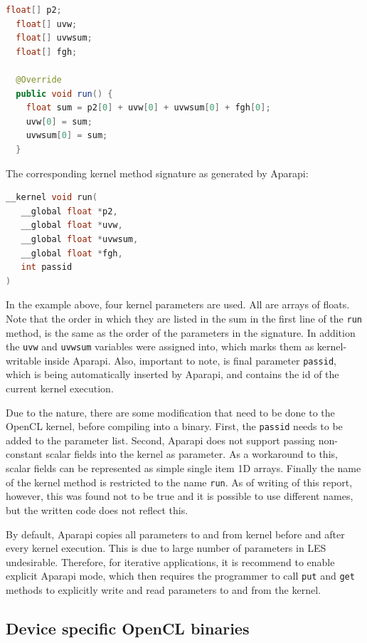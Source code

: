 \documentclass{l4proj}
\begin{document}
\begin{lstlisting}[language=Java]
  float[] p2;
  float[] uvw;
  float[] uvwsum;
  float[] fgh;

  @Override
  public void run() {
    float sum = p2[0] + uvw[0] + uvwsum[0] + fgh[0];
    uvw[0] = sum;
    uvwsum[0] = sum;
  }
\end{lstlisting}
The corresponding kernel method signature as generated by Aparapi:
\begin{lstlisting}[language=C]
__kernel void run(
   __global float *p2, 
   __global float *uvw, 
   __global float *uvwsum, 
   __global float *fgh,
   int passid
)
\end{lstlisting}
In the example above, four kernel parameters are used. All are arrays of floats.
Note that the order in which they are listed in the sum in the first line of the 
\texttt{run} method, is the same as the order of the parameters in the signature.
In addition the \texttt{uvw} and \texttt{uvwsum} variables were assigned into,
which marks them as kernel-writable inside Aparapi. Also, important to note,
is final parameter \texttt{passid}, which is being automatically inserted by Aparapi,
and contains the id of the current kernel execution.

Due to the nature, there are some modification that need to be done to the OpenCL
kernel, before compiling into a binary. First, the \texttt{passid} needs to be added to
the parameter list. Second, Aparapi does not support passing non-constant scalar fields
into the kernel as parameter. As a workaround to this, scalar fields can be represented
as simple single item 1D arrays. Finally the name of the kernel method is restricted to
the name \texttt{run}. As of writing of this report, however, this was found not to be true
and it is possible to use different names, but the written code does not reflect this.

By default, Aparapi copies all parameters to and from kernel before and after every kernel
execution. This is due to large number of parameters in LES undesirable. Therefore, for
iterative applications, it is recommend to enable explicit Aparapi mode, which then requires
the programmer to call \texttt{put} and \texttt{get} methods to explicitly write and read 
parameters to and from the kernel.

\subsection{Device specific OpenCL binaries}
\end{document}
